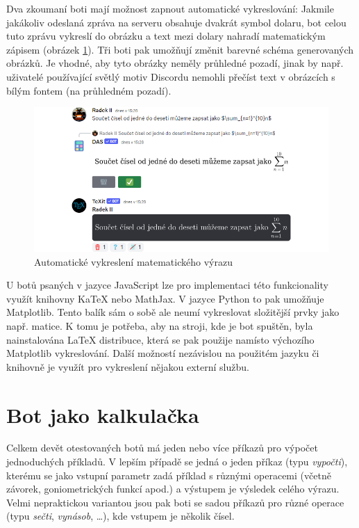 \documentclass[FM]{tulthesis}
\begin{document}
	Dva zkoumaní boti mají možnost zapnout automatické vykreslování: Jakmile jakákoliv odeslaná zpráva na serveru obsahuje dvakrát symbol dolaru, bot celou tuto zprávu vykreslí do obrázku a text mezi dolary nahradí matematickým zápisem (obrázek \ref{_tag_img_autotex}). Tři boti pak umožňují změnit barevné schéma generovaných obrázků. Je vhodné, aby tyto obrázky neměly průhledné pozadí, jinak by např. uživatelé používající světlý motiv Discordu nemohli přečíst text v obrázcích s bílým fontem (na průhledném pozadí).
	
	\begin{figure}[ht]
		\centering
		\includegraphics[width=\textwidth]{img/AutoTeX}
		\caption{Automatické vykreslení matematického výrazu}
		\label{_tag_img_autotex}
	\end{figure}
	
	U botů psaných v jazyce JavaScript lze pro implementaci této funkcionality využít knihovny KaTeX nebo MathJax. V jazyce Python to pak umožňuje Matplotlib. Tento balík sám o sobě ale neumí vykreslovat složitější prvky jako např. matice. K tomu je potřeba, aby na stroji, kde je bot spuštěn, byla nainstalována LaTeX distribuce, která se pak použije namísto výchozího Matplotlib vykreslování. Další možností nezávislou na použitém jazyku či knihovně je využít pro vykreslení nějakou externí službu.
	
	\section{Bot jako kalkulačka}
	
	Celkem devět otestovaných botů má jeden nebo více příkazů pro výpočet jednoduchých příkladů. V lepším případě se jedná o jeden příkaz (typu \textit{vypočti}), kterému se jako vstupní parametr zadá příklad s různými operacemi (včetně závorek, goniometrických funkcí apod.) a výstupem je výsledek celého výrazu. Velmi nepraktickou variantou jsou pak boti se sadou příkazů pro různé operace (typu \textit{sečti}, \textit{vynásob}, \dots), kde vstupem je několik čísel.
	
\end{document}
